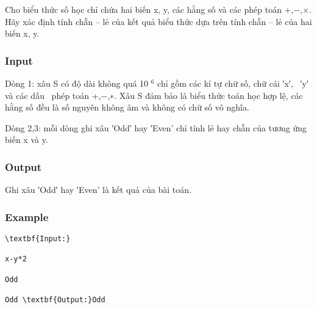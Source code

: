 



   Cho biểu thức số học chỉ chứa hai biến x, y, các hằng số và các phép toán +,−,×. Hãy xác định tính chẵn – lẻ của kết quả biểu thức dựa trên tính chẵn – lẻ của hai biến x, y.  

\subsubsection{   Input  }

   Dòng 1: xâu S có độ dài không quá 10   $^    6   $   chỉ gồm các kí tự chữ số, chữ cái ′x′,  ′y′ và các dấu  phép toán +,−,∗. Xâu S đảm bảo là biểu thức toán học hợp lệ, các hằng số đều là số nguyên không âm và không có chữ số vô nghĩa.  

   Dòng 2,3: mỗi dòng ghi xâu ′Odd′ hay ′Even' chỉ tính lẻ hay chẵn của tương ứng biến x và y.  

\subsubsection{   Output  }

   Ghi xâu ′Odd′ hay ′Even' là kết quả của bài toán.  

\subsubsection{   Example  }
\begin{verbatim}
\textbf{Input:}

x-y*2

Odd

Odd \textbf{Output:}Odd\end{verbatim}